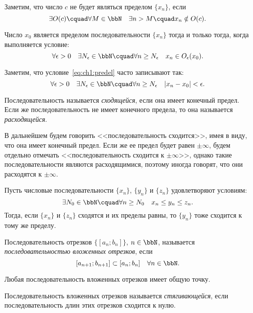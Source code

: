 Заметим, что число $c$ не будет являться пределом $\{x_n\}$, если 
$$
\exists O(c)\cquad \forall M \in \bbN\quad \exists n > M\cquad x_n \notin O(c).
$$
\begin{lemm}
Число $x_0$ является пределом последовательности $\{x_n\}$ тогда и только тогда, когда выполняется условие:
\begin{equation}
\label{eq:ch1:predel}
\forall \epsilon>0\quad \exists N_\epsilon \in \bbN\cquad \forall n \ge N_\epsilon\quad x_n \in O_\epsilon(x_0).
\end{equation}
\end{lemm}
Заметим, что условие~\eqref{eq:ch1:predel} часто записывают так:
$$
\forall \epsilon>0\quad \exists N_\epsilon \in \bbN\cquad \forall n \ge N_\epsilon\quad |x_n-x_0|<\epsilon.
$$
\begin{defn}
Последовательность называется \textit{сходящейся}, если она имеет конечный предел. Если же последовательность не имеет конечного предела, то она называется \textit{расходящейся}.
\end{defn}
В дальнейшем будем говорить <<последовательность сходится>>, имея в виду, что она имеет конечный предел. Если же ее предел будет равен $\pm\infty$, будем отдельно отмечать <<последовательность сходится к $\pm\infty$>>, однако такие последовательности являются расходящимися, поэтому иногда говорят, что они расходятся к $\pm\infty$. 
\begin{thm} \label{th:ch1:otrehposled}  
Пусть числовые последовательности $\{x_n\}$, $\{y_n\}$ и $\{z_n\}$ удовлетворяют условиям:
$$
\exists N_0 \in \bbN\cquad \forall n\ge N_0 \quad x_n \le y_n \le z_n.
$$
Тогда, если $\{x_n\}$ и $\{z_n\}$ сходятся и их пределы равны, то $\{y_n\}$ тоже сходится к тому же пределу.
\end{thm}

\begin{defn}
Последовательность отрезков $\{[a_n;b_n]\}$, $n \in \bbN$, называется \textit{последовательностью вложенных отрезков}, если
$$
[a_{n+1};b_{n+1}]\subset [a_n;b_n]\quad \forall n \in \bbN.
$$
\end{defn}

\begin{thm}[Кантора]
Любая последовательность вложенных отрезков имеет общую точку.
\end{thm}

\begin{defn}
Последовательность вложенных отрезков называется \textit{стягивающейся}, если последовательность длин этих отрезков сходится к нулю.
\end{defn}

